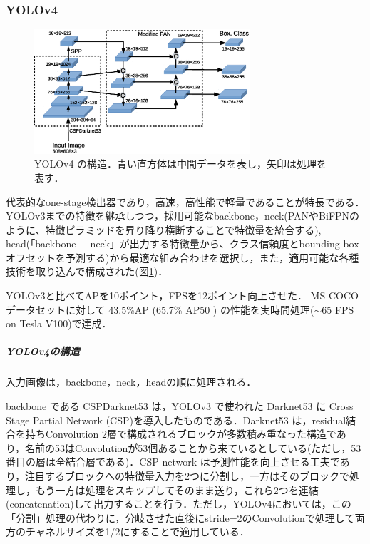\documentclass[twocolumn]{jsarticle} %
\begin{document}
\subsubsection{YOLOv4 \cite{BWL20}}
\begin{figure}[tb]
    \begin{center}
        \includegraphics[width=8cm,clip]{fig/archi_YOLOv4.eps}
    \end{center}
    \caption{ YOLOv4 の構造．青い直方体は中間データを表し，矢印は処理を表す．}
    \label{fig:archi_YOLOv4}
\end{figure}
代表的なone-stage検出器であり，高速，高性能で軽量であることが特長である．YOLOv3\cite{RedFar18}までの特徴を継承しつつ，採用可能なbackbone，neck(PANやBiFPNのように、特徴ピラミッドを昇り降り横断することで特徴量を統合する), head(「backbone + neck」が出力する特徴量から、クラス信頼度とbounding boxオフセットを予測する)から最適な組み合わせを選択し，また，適用可能な各種技術を取り込んで構成された(図\ref{fig:archi_YOLOv4})．

YOLOv3と比べてAPを10ポイント，FPSを12ポイント向上させた．
MS COCO データセットに対して 43.5\%AP (65.7\% AP50 ) の性能を実時間処理($\sim$65 FPS on Tesla V100)で達成．

\subparagraph{YOLOv4の構造}入力画像は，backbone，neck，headの順に処理される．

backbone である CSPDarknet53 は，YOLOv3 で使われた Darknet53 に Cross Stage Partial Network (CSP)を導入したものである．Darknet53 は，residual結合を持ちConvolution 2層で構成されるブロックが多数積み重なった構造であり，名前の53はConvolutionが53個あることから来ているとしている(ただし，53番目の層は全結合層である)．CSP network は予測性能を向上させる工夫であり，注目するブロックへの特徴量入力を2つに分割し，一方はそのブロックで処理し，もう一方は処理をスキップしてそのまま送り，これら2つを連結(concatenation)して出力することを行う．ただし，YOLOv4においては，この「分割」処理の代わりに，分岐させた直後にstride=2のConvolutionで処理して両方のチャネルサイズを1/2にすることで適用している．
\end{document}
